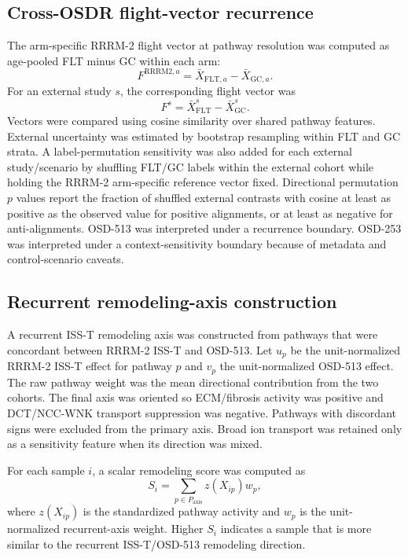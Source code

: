 \documentclass[11pt]{article}
\begin{document}
\subsection{Cross-OSDR flight-vector recurrence}

The arm-specific RRRM-2 flight vector at pathway resolution was computed as age-pooled FLT minus GC within each arm:
\begin{equation}
F^{\mathrm{RRRM2},a}=\bar{X}_{\mathrm{FLT},a}-\bar{X}_{\mathrm{GC},a}.
\end{equation}
For an external study $s$, the corresponding flight vector was
\begin{equation}
F^s=\bar{X}^s_{\mathrm{FLT}}-\bar{X}^s_{\mathrm{GC}}.
\end{equation}
Vectors were compared using cosine similarity over shared pathway features. External uncertainty was estimated by bootstrap resampling within FLT and GC strata. A label-permutation sensitivity was also added for each external study/scenario by shuffling FLT/GC labels within the external cohort while holding the RRRM-2 arm-specific reference vector fixed. Directional permutation $p$ values report the fraction of shuffled external contrasts with cosine at least as positive as the observed value for positive alignments, or at least as negative for anti-alignments. OSD-513 was interpreted under a recurrence boundary. OSD-253 was interpreted under a context-sensitivity boundary because of metadata and control-scenario caveats.

\subsection{Recurrent remodeling-axis construction}

A recurrent ISS-T remodeling axis was constructed from pathways that were concordant between RRRM-2 ISS-T and OSD-513. Let $u_p$ be the unit-normalized RRRM-2 ISS-T effect for pathway $p$ and $v_p$ the unit-normalized OSD-513 effect. The raw pathway weight was the mean directional contribution from the two cohorts. The final axis was oriented so ECM/fibrosis activity was positive and DCT/NCC-WNK transport suppression was negative. Pathways with discordant signs were excluded from the primary axis. Broad ion transport was retained only as a sensitivity feature when its direction was mixed.

For each sample $i$, a scalar remodeling score was computed as
\begin{equation}
S_i = \sum_{p\in P_{\mathrm{axis}}} z(X_{ip})w_p,
\end{equation}
where $z(X_{ip})$ is the standardized pathway activity and $w_p$ is the unit-normalized recurrent-axis weight. Higher $S_i$ indicates a sample that is more similar to the recurrent ISS-T/OSD-513 remodeling direction.
\end{document}
